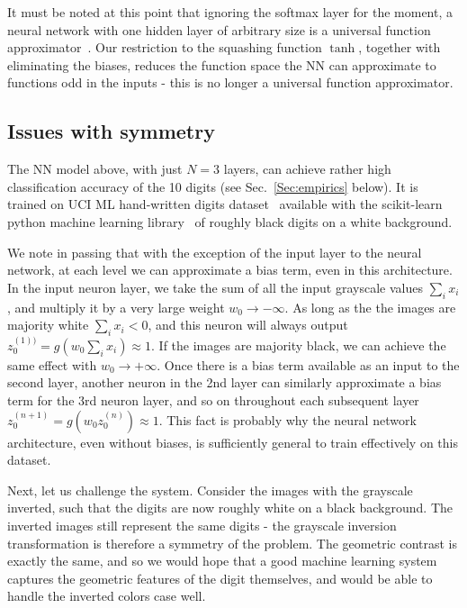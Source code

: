 \documentclass{svproc}
\begin{document}
It must be noted at this point that ignoring the softmax layer for the moment, a neural network with one hidden layer of arbitrary size is a universal function approximator~\cite{hornik1989multilayer}. Our restriction to the squashing function $\tanh$, together with eliminating the biases, reduces the function space the NN can approximate to functions odd in the inputs - this is no longer a universal function approximator.

\subsection{Issues with symmetry}

The NN model above, with just $N=3$ layers, can achieve rather high classification accuracy of the 10 digits (see Sec.~\ref{Sec:empirics} below).
It is trained on UCI ML hand-written digits dataset~\cite{Dua:2017} available with the scikit-learn python machine learning library~\cite{scikit-learn} of roughly black digits on a white background.

We note in passing that with the exception of the input layer to the neural network, at each level we can approximate a bias term, even in this architecture. In the input neuron layer, we take the sum of all the input grayscale values $\sum_i x_i$, and multiply it by a very large weight $w_0 \rightarrow -\infty$. As long as the the images are majority white $\sum_i x_i < 0$, and this neuron will always output $z_0^{(1))} = g\left( w_0 \sum_i x_i \right)\approx 1$. If the images are majority black, we can achieve the same effect with $w_0 \rightarrow +\infty$. Once there is a bias term available as an input to the second layer, another neuron in the 2nd layer can similarly approximate a bias term for the 3rd neuron layer, and so on throughout each subsequent layer $z_0^{(n+1)} = g\left( w_0 z_0^{(n)} \right)\approx 1$. This fact is probably why the neural network architecture, even without biases, is sufficiently general to train effectively on this dataset.

Next, let us challenge the system. Consider the images with the grayscale inverted, such that the digits are now roughly white on 
a black background. The inverted images still represent the same digits - the grayscale inversion transformation is therefore a symmetry of the problem. The geometric contrast is exactly the same, and so we would hope that a good machine learning system captures the geometric features of the digit themselves, and would be able to handle the inverted colors case well.
\end{document}
